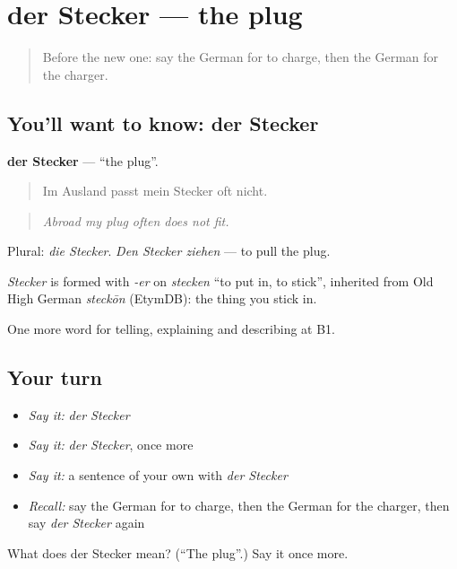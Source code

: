 \section[der Stecker]{der Stecker — the plug}

\label{lesson:GE-C392-stecker}



\begin{quote}
Before the new one: say the German for to charge, then the German for the charger.
\end{quote}

\subsection*{You'll want to know: der Stecker}
\textbf{der Stecker} — \textquotedblleft{}the plug\textquotedblright{}.

\begin{quote}
Im Ausland passt mein Stecker oft nicht.
\end{quote}

\begin{quote}
\emph{Abroad my plug often does not fit.}
\end{quote}

Plural: \emph{die Stecker}. \emph{Den Stecker ziehen} — to pull the plug.

\begin{cousinweb}
\emph{Stecker} is formed with \emph{-er} on \emph{stecken} \textquotedblleft{}to put in, to stick\textquotedblright{}, inherited from Old High German \emph{steckōn} (EtymDB): the thing you stick in.
\end{cousinweb}

\begin{grammarlens}[title={What you've built}]
One more word for telling, explaining and describing at B1.
\end{grammarlens}

\subsection*{Your turn}
\begin{itemize}
\raggedright
  \item \emph{Say it:} \emph{der Stecker}
  \item \emph{Say it:} \emph{der Stecker}, once more
  \item \emph{Say it:} a sentence of your own with \emph{der Stecker}
  \item \emph{Recall:} say the German for to charge, then the German for the charger, then say \emph{der Stecker} again
\end{itemize}

\begin{tcolorbox}[breakable,colback=teal!4,colframe=teal!35!black,title={Before you move on}]
What does der Stecker mean? (\textquotedblleft{}The plug\textquotedblright{}.) Say it once more.
\end{tcolorbox}
